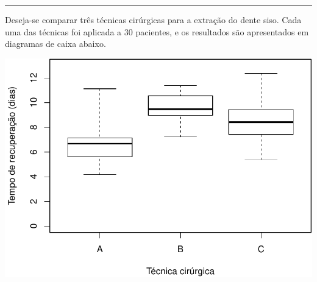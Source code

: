 \documentclass[a4paper,11pt,fleqn]{article}\usepackage[]{graphicx}\usepackage[]{color}
\newenvironment{knitrout}{}{} %
\theoremstyle{definition}
\begin{document}


\vspace{0.3cm}
\hrule
\vspace{0.3cm}

\begin{compactenum}[6.] %
\item Deseja-se comparar três técnicas cirúrgicas para a extração do
  dente siso. Cada uma das técnicas foi aplicada a 30 pacientes, e os
  resultados são apresentados em diagramas de caixa abaixo.\vspace{1em}
\begin{knitrout}\small
{}\color{fgcolor}

{\centering \includegraphics[width=.5\textwidth]{figure/siso-1} 

}




\end{knitrout}
\end{compactenum}
\end{document}
